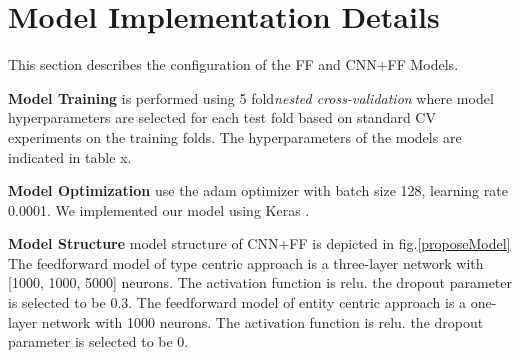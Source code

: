 \section{Model Implementation Details}
This section describes the configuration of the FF and CNN+FF Models.

\textbf{Model Training} is performed using 5 fold\textit{nested cross-validation} \cite{cawley2010over} where model hyperparameters are selected for each test fold based on standard CV experiments on the training folds. The hyperparameters of the models are indicated in table x.

\textbf{Model Optimization} use the adam optimizer with batch size 128, learning rate 0.0001. We implemented our model using Keras \cite{chollet2015keras}.

\textbf{Model Structure} model structure of CNN+FF is depicted in fig.\ref{proposeModel} The feedforward model of type centric approach is a three-layer network with [1000, 1000, 5000] neurons. The activation function is relu. the dropout parameter is selected to be 0.3. The feedforward model of entity centric approach is a one-layer network with 1000 neurons. The activation function is relu. the dropout parameter is selected to be 0.

